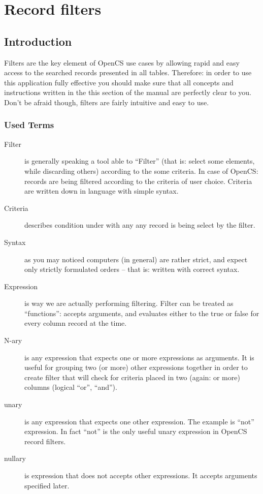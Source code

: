 \section{Record filters}
\subsection{Introduction}
Filters are the key element of OpenCS use cases by allowing rapid and easy access to the searched records presented in all tables. Therefore: in order to use this application fully effective you should make sure that all concepts and instructions written in the this section of the manual are perfectly clear to you.\\
Don't be afraid though, filters are fairly intuitive and easy to use.

\subsubsection{Used Terms}

\begin{description}
 \item[Filter] is generally speaking a tool able to ``Filter'' (that is: select some elements, while discarding others) according to the some criteria. In case of OpenCS: records are being filtered according to the criteria of user choice. Criteria are written down in language with simple syntax.
 \item[Criteria] describes condition under with any any record is being select by the filter.
 \item[Syntax] as you may noticed computers (in general) are rather strict, and expect only strictly formulated orders -- that is: written with correct syntax.
 \item[Expression] is way we are actually performing filtering. Filter can be treated as ``functions'': accepts arguments, and evaluates either to the true or false for every column record at the time.
 \item[N-ary] is any expression that expects one or more expressions as arguments. It is useful for grouping two (or more) other expressions together in order to create filter that will check for criteria placed in two (again: or more) columns (logical ``or'', ``and'').
 \item[unary] is any expression that expects one other expression. The example is ``not'' expression. In fact ``not'' is the only useful unary expression in OpenCS record filters.
 \item[nullary] is expression that does not accepts other expressions. It accepts arguments specified later.
\end{description}

